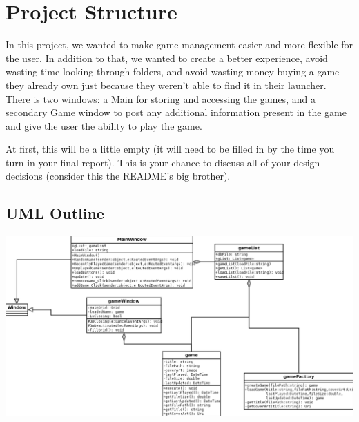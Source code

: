 \documentclass[10pt,conference,onecolumn,compsoc]{IEEEtran}
\begin{document}
%
\section{Project Structure}
In this project, we wanted to make game management easier and more flexible for the user. In addition to that, we wanted to create a better experience, avoid wasting time looking through folders, and avoid wasting money buying a game they already own just because they weren't able to find it in their launcher. There is two windows: a Main for storing and accessing the games, and a secondary Game window to post any additional information present in the game and give the user the ability to play the game.

At first, this will be a little empty (it will need to be filled in by the time you turn in your final report).  This is your chance to discuss all of your design decisions (consider this the README's big brother).

\subsection{UML Outline}
\includegraphics[width=6in]{groupprojectuml.png}
%
%
%
\end{document}
